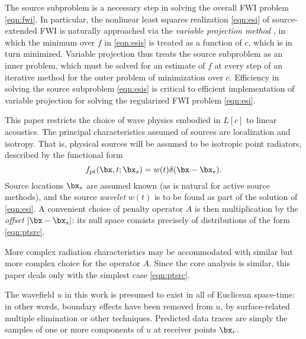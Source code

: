 The source subproblem is a necessary step in solving the overall FWI problem \ref{eqn:fwi}. In particular, the nonlinear least squares realization \ref{eqn:esi} of source-extended FWI is naturally approached via the {\em variable projection method} \cite[]{GolubPereyra:73,GolubPereyra:03,vanLeeuwenMulder:09,Rickett:SEG12}, in which the minimum over $f$ in \ref{eqn:esis} is treated as a function of $c$, which is in turn minimized. Variable projection thus treats the source subproblem as an inner problem, which must be solved for an estimate of $f$ at every step of an iterative method for the outer problem of minimization over $c$. Efficiency in solving the source subproblem \ref{eqn:esis} is critical to efficient implementation of variable projection for solving the regularized FWI problem \ref{eqn:esi}.

This paper restricts the choice of wave physics embodied in $L[c]$ to linear acoustics.  The principal characteristics assumed of sources are localization and isotropy. That is, physical sources will be assumed to be isotropic point radiators, described by the functional form
\begin{equation}
\label{eqn:ptsrc}
f_{\rm pt}(\bx,t;\bx_s) = w(t)\delta(\bx-\bx_s). 
\end{equation}
Source locations $\bx_s$ are assumed known (as is natural for active source methods), and the source {\em wavelet} $w(t)$ is to be found as part of the solution of \ref{eqn:esi}. A convenient choice of penalty operator $A$ is then multiplication by the {\em offset} $|\bx-\bx_s|$: its null space consists precisely of distributions of the form \ref{eqn:ptsrc}. 

More complex radiation characteristics may be accommodated with similar but more complex choice for the operator $A$. Since the core analysis is similar, this paper deals only with the simplest case \ref{eqn:ptsrc}.

The wavefield $u$ in this work is presumed to exist in all of Euclicean space-time: in other words, boundary effects have been removed from $u$, by surface-related multiple elimination or other techniques. Predicted data traces are simply the samples of one or more components of $u$ at receiver points $\bx_r$.


